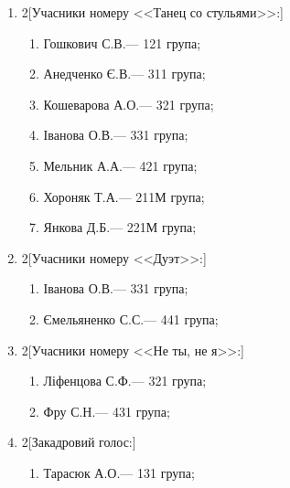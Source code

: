 \documentclass[
	a4paper,
	12pt,
	oneside,
	draft
]{extreport}
\begin{document}
\begin{enumerate}[topsep=0pt,itemsep=-1ex,partopsep=0ex,parsep=1ex]
\item 
\begin{multicols}{2}[Учасники номеру <<Танец со стульями>>:] 
\begin{enumerate}[topsep=0pt,itemsep=-1ex,partopsep=0ex,parsep=1ex,label=\arabic*.]
\item Гошкович С.В.\hfill --- 121 група;
\item Анедченко Є.В.\hfill --- 311 група;
\item Кошеварова А.О.\hfill --- 321 група;
\item Іванова О.В.\hfill --- 331 група;
\item Мельник А.А.\hfill --- 421 група;
\item Хороняк Т.А.\hfill --- 211М група;
\item Янкова Д.Б.\hfill --- 221М група;
\end{enumerate}
\end{multicols}

\item 
\begin{multicols}{2}[Учасники номеру <<Дуэт>>:] 
\begin{enumerate}[topsep=0pt,itemsep=-1ex,partopsep=0ex,parsep=1ex,label=\arabic*.]
\item Іванова О.В.\hfill --- 331 група;
\item Ємельяненко С.С.\hfill --- 441 група;
\end{enumerate}
\end{multicols}

\item 
\begin{multicols}{2}[Учасники номеру <<Не ты, не я>>:] 
\begin{enumerate}[topsep=0pt,itemsep=-1ex,partopsep=0ex,parsep=1ex,label=\arabic*.]
\item Ліфенцова С.Ф.\hfill --- 321 група;
\item Фру С.Н.\hfill --- 431 група;
\end{enumerate}
\end{multicols}

\item 
\begin{multicols}{2}[Закадровий голос:] 
\begin{enumerate}[topsep=0pt,itemsep=-1ex,partopsep=0ex,parsep=1ex,label=\arabic*.]
\item Тарасюк А.О.\hfill --- 131 група;
\end{enumerate}
\end{multicols}


\end{enumerate}
\end{document}
